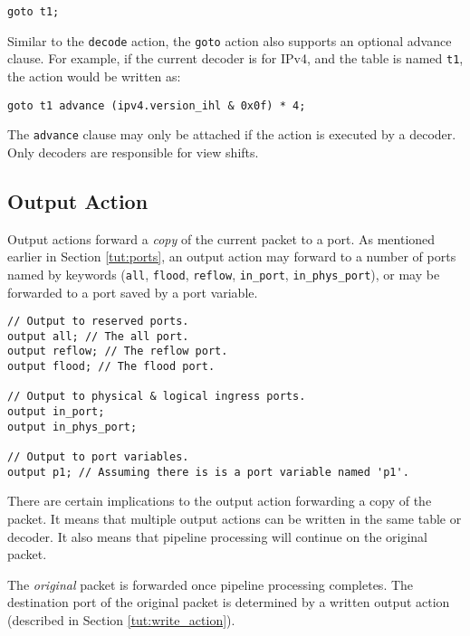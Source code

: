 \begin{lstlisting}
goto t1;
\end{lstlisting}

Similar to the \texttt{decode} action, the \texttt{goto} action also supports an
optional advance clause. For example, if the current decoder is for IPv4, and
the table is named \texttt{t1}, the action would be written as:

\begin{lstlisting}
goto t1 advance (ipv4.version_ihl & 0x0f) * 4;
\end{lstlisting}

The \texttt{advance} clause may only be attached if the action is executed by a
decoder. Only decoders are responsible for view shifts.

\subsection{Output Action} \label{tut:output_action}

Output actions forward a \textit{copy} of the current packet to a port. As
mentioned earlier in Section \ref{tut:ports}, an output action may forward to a
number of ports named by keywords (\texttt{all}, \texttt{flood},
\texttt{reflow}, \texttt{in\_port}, \texttt{in\_phys\_port}), or may be
forwarded to a port saved by a port variable.

\begin{codepage}
\begin{lstlisting}
// Output to reserved ports.
output all; // The all port.
output reflow; // The reflow port.
output flood; // The flood port.

// Output to physical & logical ingress ports.
output in_port;
output in_phys_port;

// Output to port variables.
output p1; // Assuming there is is a port variable named 'p1'.
\end{lstlisting}
\end{codepage}

There are certain implications to the output action forwarding a copy of the packet. 
It means that multiple output actions can be written in
the same table or decoder. It also means that pipeline processing will continue
on the original packet.

The \textit{original} packet is forwarded once pipeline processing completes.
The destination port of the original packet is determined by a written output
action (described in Section \ref{tut:write_action}).

